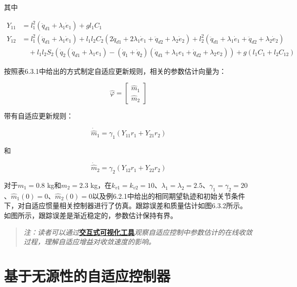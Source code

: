 \documentclass[12pt,a4paper]{ctexart}
\begin{document}
其中

\begin{align}
Y_{11} &= l_1^2(\ddot{q}_{d1} + \lambda_1\dot{e}_1) + g l_1 C_1 \\
Y_{12} &= l_1^2(\ddot{q}_{d1} + \lambda_1\dot{e}_1) + l_1 l_2 C_2(2\ddot{q}_{d1} + 2\lambda_1\dot{e}_1 + \ddot{q}_{d2} + \lambda_2\dot{e}_2) + l_2^2(\ddot{q}_{d1} + \lambda_1\dot{e}_1 + \ddot{q}_{d2} + \lambda_2\dot{e}_2) \\
&\quad + l_1 l_2 S_2(\dot{q}_2(\dot{q}_{d1} + \lambda_1 e_1) - (\dot{q}_1 + \dot{q}_2)(\dot{q}_{d1} + \lambda_1 e_1 + \dot{q}_{d2} + \lambda_2 e_2)) + g(l_1 C_1 + l_2 C_{12})
\end{align}

按照表6.3.1中给出的方式制定自适应更新规则，相关的参数估计向量为：

\begin{equation}
\hat{\varphi} = \begin{bmatrix} \hat{m}_1 \\ \hat{m}_2 \end{bmatrix}
\end{equation}

带有自适应更新规则：

\begin{equation}
\dot{\hat{m}}_1 = \gamma_1(Y_{11}r_1 + Y_{21}r_2)
\end{equation}

和

\begin{equation}
\dot{\hat{m}}_2 = \gamma_2(Y_{12}r_1 + Y_{22}r_2)
\end{equation}

对于$m_1 = 0.8$ kg和$m_2 = 2.3$ kg，在$k_{v1} = k_{v2} = 10$、$\lambda_1 = \lambda_2 = 2.5$、$\gamma_1 = \gamma_2 = 20$、$\hat{m}_1(0) = 0$、$\hat{m}_2(0) = 0$以及例6.2.1中给出的相同期望轨迹和初始关节条件下，对自适应惯量相关控制器进行了仿真。跟踪误差和质量估计如图6.3.2所示。如图所示，跟踪误差是渐近稳定的，参数估计保持有界。

\begin{quote}
\textit{注：读者可以通过}\href{https://frankjie09.github.io/Robot-Manipulator-Control-CN/figures/Adaptive_Control.html}{\textbf{交互式可视化工具}}\textit{观察自适应控制中参数估计的在线收敛过程，理解自适应增益对收敛速度的影响。}
\end{quote}

\section{基于无源性的自适应控制器}\label{sec:passivity}
\end{document}
